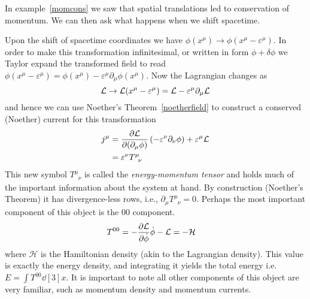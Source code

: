 In example~\ref{momcons} we saw that spatial translations led to conservation of
momentum. We can then ask what happens when we shift spacetime.
\begin{example}\label{ex:enmomtensor}
    Upon the shift of spacetime coordinates we have
    \(\phi(x^\mu)\to\phi(x^\mu - \varepsilon^\mu)\). In order to make this
    transformation infinitesimal, or written in form \(\phi + \delta\phi\) we
    Taylor expand the transformed field to read \(\phi(x^\mu - \varepsilon^\mu) = \phi(x^\mu) - \varepsilon^\mu\partial_\mu\phi(x^\mu)\).
    Now the Lagrangian changes as
    \begin{equation}
        \mathcal{L}\to \mathcal{L}(x^\mu - \varepsilon^\mu) = \mathcal{L} - \varepsilon^\mu\partial_\mu\mathcal{L}
    \end{equation}
    and hence we can use Noether's Theorem~\ref{noetherfield} to construct a
    conserved (Noether) current for this transformation
    \begin{align}\label{eq:enmomtensor}
        j^\mu & = \pdv{\mathcal{L}}{(\partial_\mu\phi)}\left(-\varepsilon^\nu\partial_\nu\phi\right) + \varepsilon^\mu\mathcal{L} \\
              & = \varepsilon^\nu T^\mu_{\phantom{\mu}\nu}
    \end{align}
    This new symbol \(T^\mu_{\phantom{\mu}\nu}\) is called the
    \textit{energy-momentum tensor} and holds much of the important information
    about the system at hand. By construction (Noether's Theorem) it has
    divergence-less rows, i.e., \(\partial_\mu T^\mu_{\phantom{\mu}\nu} = 0\).
    Perhaps the most important component of this object is the \(00\) component.
    \begin{align}
        T^{00} & = -\pdv{\mathcal{L}}{\dot{\phi}}\dot{\phi} - \mathcal{L} = -\mathcal{H}
    \end{align}
    where \(\mathcal{H}\) is the Hamiltonian density (akin to the Lagrangian
    density). This value is exactly the energy density, and integrating it
    yields the total energy i.e. \(E = \int T^{00}\dd[3]{x}\). It is important
    to note all other components of this object are very familiar, such as
    momentum density and momentum currents.
\end{example}